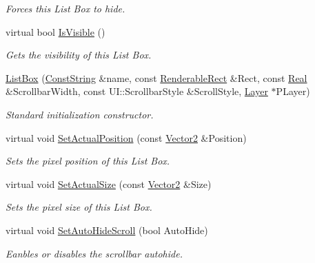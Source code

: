 \begin{DoxyCompactItemize}
\begin{DoxyCompactList}\small\item\em Forces this List Box to hide. \item\end{DoxyCompactList}\item 
virtual bool \hyperlink{classphys_1_1UI_1_1ListBox_a638f19eb6e5a0bd3291fab1ebaccc84f}{IsVisible} ()
\begin{DoxyCompactList}\small\item\em Gets the visibility of this List Box. \item\end{DoxyCompactList}\item 
\hyperlink{classphys_1_1UI_1_1ListBox_a01fe1d84b537fac03244a023406a839e}{ListBox} (\hyperlink{namespacephys_a5ce5049f8b4bf88d6413c47b504ebb31}{ConstString} \&name, const \hyperlink{structphys_1_1UI_1_1RenderableRect}{RenderableRect} \&Rect, const \hyperlink{namespacephys_af7eb897198d265b8e868f45240230d5f}{Real} \&ScrollbarWidth, const UI::ScrollbarStyle \&ScrollStyle, \hyperlink{classphys_1_1UI_1_1Layer}{Layer} $\ast$PLayer)
\begin{DoxyCompactList}\small\item\em Standard initialization constructor. \item\end{DoxyCompactList}\item 
virtual void \hyperlink{classphys_1_1UI_1_1ListBox_a4bf1911c639429c783915ba8a543fec3}{SetActualPosition} (const \hyperlink{classphys_1_1Vector2}{Vector2} \&Position)
\begin{DoxyCompactList}\small\item\em Sets the pixel position of this List Box. \item\end{DoxyCompactList}\item 
virtual void \hyperlink{classphys_1_1UI_1_1ListBox_a742810da75f2b3889794498f05af8860}{SetActualSize} (const \hyperlink{classphys_1_1Vector2}{Vector2} \&Size)
\begin{DoxyCompactList}\small\item\em Sets the pixel size of this List Box. \item\end{DoxyCompactList}\item 
virtual void \hyperlink{classphys_1_1UI_1_1ListBox_a60fc5c1907df6d83217b25c2c8f15f48}{SetAutoHideScroll} (bool AutoHide)
\begin{DoxyCompactList}\small\item\em Eanbles or disables the scrollbar autohide. \item\end{DoxyCompactList}\item 

\end{DoxyCompactItemize}
